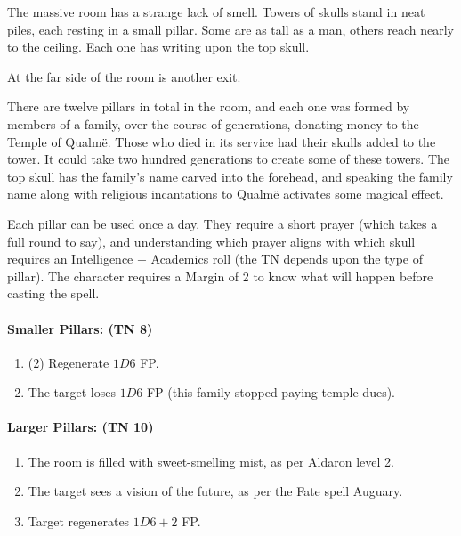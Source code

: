 \begin{multicols}{2}
\begin{boxtext}

	The massive room has a strange lack of smell.  Towers of skulls stand in neat piles, each resting in a small pillar.  Some are as tall as a man, others reach nearly to the ceiling.  Each one has writing upon the top skull.

	At the far side of the room is another exit.

\end{boxtext}

There are twelve pillars in total in the room, and each one was formed by members of a family, over the course of generations, donating money to the Temple of Qualm\"{e}.  Those who died in its service had their skulls added to the tower.  It could take two hundred generations to create some of these towers.  The top skull has the family's name carved into the forehead, and speaking the family name along with religious incantations to Qualm\"{e} activates some magical effect.

Each pillar can be used once a day.  They require a short prayer (which takes a full round to say), and understanding which prayer aligns with which skull requires an Intelligence + Academics roll (the TN depends upon the type of pillar).  The character requires a Margin of 2 to know what will happen before casting the spell.

\paragraph{Smaller Pillars: (TN 8)}

\begin{enumerate}

	\item{(2) Regenerate $1D6$ FP.}
	\item{The target loses $1D6$ FP (this family stopped paying temple dues).}
\end{enumerate}

\paragraph{Larger Pillars: (TN 10)}

\begin{enumerate}

	\item{The room is filled with sweet-smelling mist, as per Aldaron level 2.}
	\item{The target sees a vision of the future, as per the Fate spell Auguary.}
	\item{Target regenerates $1D6+2$ FP.}
\end{enumerate}


\end{multicols}
